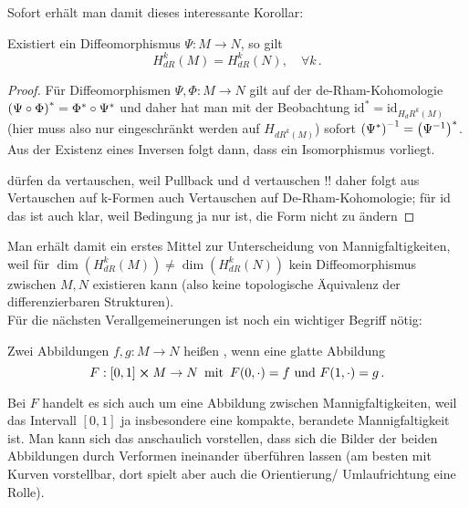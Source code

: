 \documentclass[../H_Analysis_main.tex]{subfiles}
\begin{document}
Sofort erhält man damit dieses interessante Korollar:
\begin{cor}
Existiert ein Diffeomorphismus $\Psi: M \rightarrow N$, so gilt
\begin{equation}
H_{dR}^k(M) = H_{dR}^k(N), \quad \forall k \, .
\end{equation}
\end{cor}
\begin{proof}
Für Diffeomorphismen $\Psi, \Phi: M \rightarrow N$ gilt auf der de-Rham-Kohomologie $\qty(\Psi \circ \Phi)^* = \Phi^* \circ \Psi^*$ und daher hat man mit der Beobachtung $\text{id}^* = \text{id}_{H_dR^k(M)}$ (hier muss also nur eingeschränkt werden auf $H_{dR^k(M)}$) sofort $\qty(\Psi^*)^{-1} = \qty(\Psi^{-1})^*$. Aus der Existenz eines Inversen folgt dann, dass ein Isomorphismus vorliegt.

dürfen da vertauschen, weil Pullback und d vertauschen !! daher folgt aus Vertauschen auf k-Formen auch Vertauschen auf De-Rham-Kohomologie; für id das ist auch klar, weil Bedingung ja nur ist, die Form nicht zu ändern
\end{proof}
Man erhält damit ein erstes Mittel zur Unterscheidung von Mannigfaltigkeiten, weil für $\dim(H_{dR}^k(M)) \neq \dim(H_{dR}^k(N))$ kein Diffeomorphismus zwischen $M, N$ existieren kann (also keine topologische Äquivalenz der differenzierbaren Strukturen).\\


Für die nächsten Verallgemeinerungen ist noch ein wichtiger Begriff nötig:
\begin{defi}[Homotopie]
Zwei Abbildungen $f, g: M \rightarrow N$ heißen , wenn eine glatte Abbildung
\begin{equation}
F: [0, 1] \cross M \rightarrow N \, \text{ mit } \, F(0, \cdot) = f \text{ und } F(1, \cdot) = g \, .
\end{equation}
\end{defi}
Bei $F$ handelt es sich auch um eine Abbildung zwischen Mannigfaltigkeiten, weil das Intervall $[0, 1]$ ja insbesondere eine kompakte, berandete Mannigfaltigkeit ist. Man kann sich das anschaulich vorstellen, dass sich die Bilder der beiden Abbildungen durch Verformen ineinander überführen lassen (am besten mit Kurven vorstellbar, dort spielt aber auch die Orientierung/ Umlaufrichtung eine Rolle).

\end{document}
